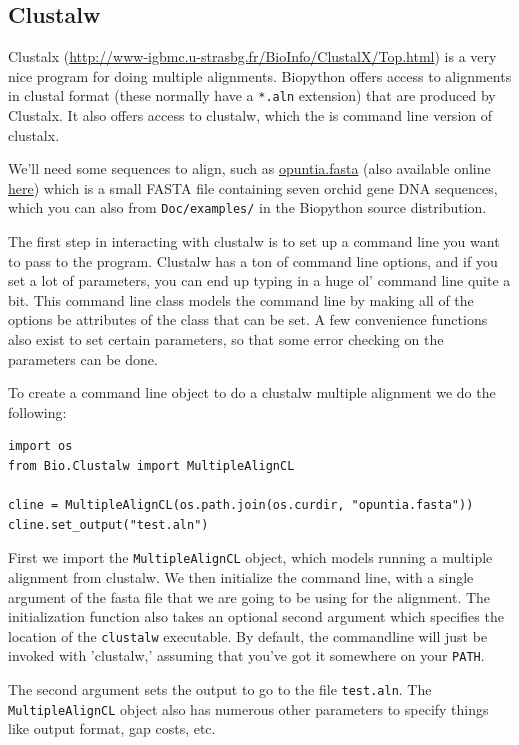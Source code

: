 \documentclass{report}
\begin{document}
\subsection{Clustalw}
\label{sec:align_clustal}

Clustalx (\url{http://www-igbmc.u-strasbg.fr/BioInfo/ClustalX/Top.html}) is a very nice program for doing multiple alignments. Biopython offers access to alignments in clustal format (these normally have a \verb|*.aln| extension) that are produced by Clustalx. It also offers access to clustalw, which the is command line version of clustalx.

We'll need some sequences to align, such as \href{examples/opuntia.fasta}{opuntia.fasta} (also available online \href{http://biopython.org/DIST/docs/tutorial/examples/opuntia.fasta}{here}) which is a small FASTA file containing seven orchid gene DNA sequences, which you can also from \verb|Doc/examples/| in the Biopython source distribution.

The first step in interacting with clustalw is to set up a command line you want to pass to the program. Clustalw has a ton of command line options, and if you set a lot of parameters, you can end up typing in a huge ol' command line quite a bit. This command line class models the command line by making all of the options be attributes of the class that can be set. A few convenience functions also exist to set certain parameters, so that some error checking on the parameters can be done.

To create a command line object to do a clustalw multiple alignment we do the following:

\begin{verbatim}
import os
from Bio.Clustalw import MultipleAlignCL

cline = MultipleAlignCL(os.path.join(os.curdir, "opuntia.fasta"))
cline.set_output("test.aln")
\end{verbatim}

First we import the \verb|MultipleAlignCL| object, which models running a multiple alignment from clustalw. We then initialize the command line, with a single argument of the fasta file that we are going to be using for the alignment. The initialization function also takes an optional second argument which specifies the location of the \verb|clustalw| executable. By default, the commandline will just be invoked with 'clustalw,' assuming that you've got it somewhere on your \verb|PATH|.

The second argument sets the output to go to the file \verb|test.aln|. The \verb|MultipleAlignCL| object also has numerous other parameters to specify things like output format, gap costs, etc.
\end{document}
